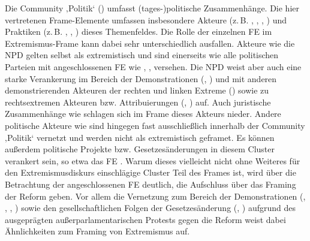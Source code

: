 \largerpage[2]
Die Community ‚Politik` () umfasst (tages\mbox{-})politische Zusammenhänge. Die hier vertretenen Frame-Elemente umfassen insbesondere Akteure (z.\,B. , , , ) und Praktiken (z.\,B. , , ) dieses Themenfeldes. Die Rolle der einzelnen FE im Extremismus-Frame kann dabei sehr unterschiedlich ausfallen. Akteure wie die NPD gelten selbst als extremistisch und sind einerseits wie alle politischen Parteien mit angeschlossenen FE wie , ,  versehen. Die NPD weist aber auch eine starke Verankerung im Bereich der Demonstrationen (, ) und mit anderen demonstrierenden Akteuren der rechten und linken Extreme () sowie zu rechtsextremen Akteuren bzw. Attribuierungen (, ) auf. Auch juristische Zusammenhänge wie  schlagen sich im Frame dieses Akteurs nieder. Andere politische Akteure wie  sind hingegen fast ausschließlich innerhalb der Community ‚Politik` vernetzt und werden nicht als extremistisch geframet. Es können außerdem politische Projekte bzw. Gesetzesänderungen in diesem Cluster verankert sein, so etwa das FE . Warum dieses vielleicht nicht ohne Weiteres für den Extremismusdiskurs einschlägige Cluster Teil des Frames ist, wird über die Betrachtung der angeschlossenen FE deutlich, die Aufschluss über das Framing der Reform geben. Vor allem die Vernetzung zum Bereich der Demonstrationen (, , , ) sowie den gesellschaftlichen Folgen der Gesetzesänderung (, ) aufgrund des ausgeprägten außerparlamentarischen Protests gegen die Reform weist dabei Ähnlichkeiten zum Framing von Extremismus auf.

